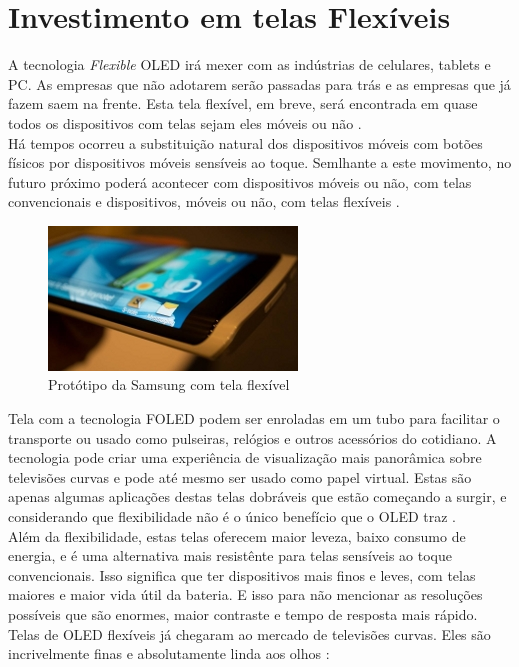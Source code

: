 \section{Investimento em telas Flexíveis}
\label{sec:investimento}

A tecnologia \textit{Flexible} OLED irá mexer com as indústrias de celulares, tablets e PC. As empresas que não adotarem serão passadas para trás e as empresas que já fazem saem na frente. Esta tela flexível, em breve, será encontrada em quase todos os dispositivos com telas sejam eles móveis ou não \cite{FSIJS}.\\

Há tempos ocorreu a substituição natural dos dispositivos móveis com botões físicos por dispositivos móveis sensíveis ao toque. Semlhante a este movimento, no futuro próximo poderá acontecer com dispositivos móveis ou não, com telas convencionais e dispositivos, móveis ou não, com telas flexíveis \cite{FSIJS}.\\

\begin{figure}[!ht]
  \centering
  \includegraphics[width=.70\textwidth]{./figuras/oled-samsung-device} 
  \caption{Protótipo da Samsung com tela flexível}
  \label{fig:oled-samsung-device} 
\end{figure}

Tela com a tecnologia FOLED podem ser enroladas em um tubo para facilitar o transporte ou usado como pulseiras, relógios e outros acessórios do cotidiano. A tecnologia pode criar uma experiência de visualização mais panorâmica sobre televisões curvas e pode até mesmo ser usado como papel virtual. Estas são apenas algumas aplicações destas telas dobráveis que estão começando a surgir, e considerando que flexibilidade não é o único benefício que o OLED traz \cite{FSIJS}.\\

Além da flexibilidade, estas telas oferecem maior leveza, baixo consumo de energia, e é uma alternativa mais resistênte para telas sensíveis ao toque convencionais. Isso significa que ter dispositivos mais finos e leves, com telas maiores e maior vida útil da bateria. E isso para não mencionar as resoluções possíveis que são enormes, maior contraste e tempo de resposta mais rápido. Telas de OLED flexíveis já chegaram ao mercado de televisões curvas. Eles são incrivelmente finas e absolutamente linda aos olhos \cite{FSIJS}:\\

